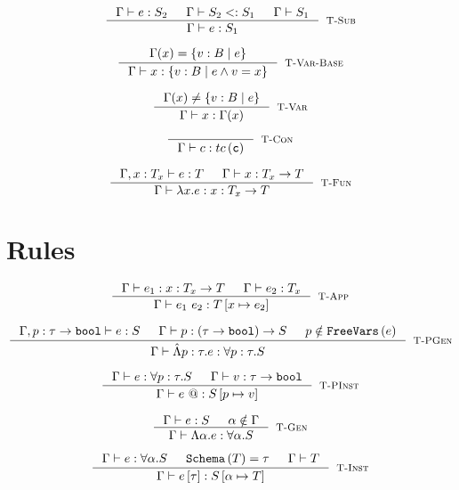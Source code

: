 \hfill{}

$$
\inference{
	\hastype{\Gamma}{e}{S_2} && \isSub{\Gamma}{S_2}{S_1}
	&& \isWellFormed{\Gamma}{S_1}
}{
	\hastype{\Gamma}{e}{S_1}
}[\tsub]
$$

$$
\inference{
	\Gamma(x) = \tref{B}{e}
}{
	\hastype{\Gamma}{x}{\tref{B}{e \land \vref = x}}
}[\rulename{T-Var-Base}]
$$

$$
\inference{
	\Gamma(x) \neq \tref{B}{e}
}{
	\hastype{\Gamma}{x}{\Gamma(x)}
}[\rulename{T-Var}]
$$

$$
\inference{
}{
	\hastype{\Gamma}{c}{\tc{c}}
}[\tconst]
$$

$$
\inference{
	\hastype{\Gamma, x : \mlTy{T_x}}{e}{\mlTy{T}} 
	&& \isWellFormed{\Gamma}{\tfun{x}{\mlTy{T_x}}{\mlTy{T}}}
}{
	\hastype{\Gamma}{\efun{x}{e}}{\tfun{x}{\mlTy{T_x}}{\mlTy{T}}}
}[\rulename{T-Fun}]
$$

\section*{Rules}
$$\label{tapp}
\inference{
	\hastype{\Gamma}{e_1}{\tfun{x}{T_x}{T}} && 
	\hastype{\Gamma}{e_2}{T_x}
}{
	\hastype{\Gamma}{\eapp{e_1}{e_2}}{T\sub{x}{e_2}}
}[\tapp]
$$

$$
\inference{
	\hastype{\Gamma, p:\tau \rightarrow \tbbool}{e}{S} &&
	\isWellFormed{\Gamma}{\tfun{p}{(\tau \rightarrow \tbbool)}{S}} &&
	p \notin \fv{e}
}{
	\hastype{\Gamma}{\epabs{p}{\tau}{e}}{\tpabs{p}{\tau}{S}}
}[\tpgen]
$$

$$
\inference{
	\hastype{\Gamma}{e}{\tpabs{p}{\tau}{S}} && 
	\hastype{\Gamma}{v}{\tau \rightarrow \tbbool} 
}{
	\hastype{\Gamma}{\epapp{e}}{S\sub{p}{v}}
}[\tpinst]
$$

$$
\inference{
	\hastype{\Gamma}{e}{S} && 
	\alpha \notin \Gamma
}{
	\hastype{\Gamma}{\etabs{\alpha}{e}}{\ttabs{\alpha}{S}}
}[\tgen]
$$

$$
\inference{
	\hastype{\Gamma}{e}{\ttabs{\alpha}{S}} && 
	\sch{\mlTy{T}} = \tau && \isWellFormed{\Gamma}{\mlTy{T}}
}{
	\hastype{\Gamma}{\etapp{e}{\tau}}{S\sub{\alpha}{\mlTy{T}}}
}[\tinst]
$$




